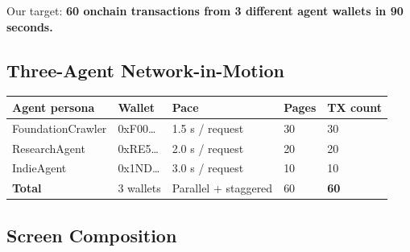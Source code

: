 \documentclass[11pt,a4paper]{article}
\begin{document}
Our target: \textbf{60 onchain transactions from 3 different agent wallets in 90 seconds.}

\subsection{Three-Agent Network-in-Motion}

\begin{table}[H]
\centering
\footnotesize
\begin{tabularx}{\textwidth}{@{} l l l l l @{}}
\toprule
\textbf{Agent persona} & \textbf{Wallet} & \textbf{Pace} & \textbf{Pages} & \textbf{TX count} \\
\midrule
FoundationCrawler & 0xF00\ldots & 1.5 s / request & 30 & 30 \\
ResearchAgent & 0xRE5\ldots & 2.0 s / request & 20 & 20 \\
IndieAgent & 0x1ND\ldots & 3.0 s / request & 10 & 10 \\
\midrule
\textbf{Total} & 3 wallets & Parallel + staggered & 60 & \textbf{60} \\
\bottomrule
\end{tabularx}
\end{table}

\subsection{Screen Composition}
\end{document}
